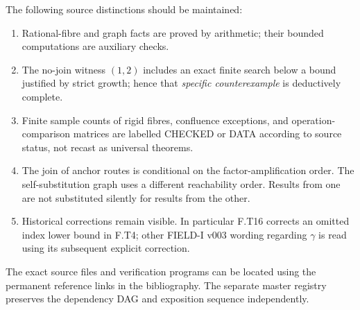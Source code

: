 \documentclass[11pt,oneside,openany]{book}
\theoremstyle{definition}
\theoremstyle{remark}
\begin{document}
The following source distinctions should be maintained:
\begin{enumerate}
\item Rational-fibre and graph facts are proved by arithmetic; their bounded computations are auxiliary checks.
\item The no-join witness \((1,2)\) includes an exact finite search below a bound justified by strict growth; hence that \emph{specific counterexample} is deductively complete.
\item Finite sample counts of rigid fibres, confluence exceptions, and operation-comparison matrices are labelled \textsf{CHECKED} or \textsf{DATA} according to source status, not recast as universal theorems.
\item The join of anchor routes is conditional on the factor-amplification order. The self-substitution graph uses a different reachability order. Results from one are not substituted silently for results from the other.
\item Historical corrections remain visible. In particular F.T16 corrects an omitted index lower bound in F.T4; other FIELD-I v003 wording regarding \(\gamma\) is read using its subsequent explicit correction.
\end{enumerate}

The exact source files and verification programs can be located using the permanent reference links in the bibliography. The separate master registry preserves the dependency DAG and exposition sequence independently.
\end{document}
